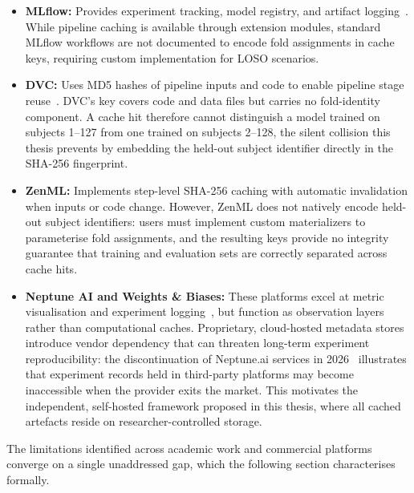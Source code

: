\begin{itemize}
\item \textbf{MLflow:} Provides experiment tracking, model registry, and
 artifact logging~\cite{zaharia2018mlflow}. While pipeline caching is
 available through extension modules, standard MLflow workflows are
 not documented to encode fold assignments in cache keys, requiring
 custom implementation for LOSO scenarios.

\item \textbf{DVC:} Uses MD5 hashes of pipeline inputs and code to enable
 pipeline stage reuse~\cite{dvc_pipelines}. DVC's key covers code and
 data files but carries no fold-identity component. A cache hit therefore
 cannot distinguish a model trained on subjects 1--127 from one trained on
 subjects 2--128, the silent collision this thesis prevents by embedding
 the held-out subject identifier directly in the SHA-256 fingerprint.

\item \textbf{ZenML:} Implements step-level SHA-256 caching with automatic
 invalidation when inputs or code change. However, ZenML does not natively
 encode held-out subject identifiers: users must implement custom
 materializers to parameterise fold assignments, and the resulting keys
 provide no integrity guarantee that training and evaluation sets are
 correctly separated across cache hits.

\item \textbf{Neptune AI and Weights \& Biases:} These platforms excel at
 metric visualisation and experiment logging~\cite{wandb2024docs}, but
 function as observation layers rather than computational caches.
 Proprietary, cloud-hosted metadata stores introduce vendor dependency
 that can threaten long-term experiment reproducibility: the
 discontinuation of Neptune.ai services in 2026~\cite{neptune2026shutdown}
 illustrates that experiment records held in third-party platforms may
 become inaccessible when the provider exits the market. This motivates
 the independent, self-hosted framework proposed in this thesis, where
 all cached artefacts reside on researcher-controlled storage.
\end{itemize}

The limitations identified across academic work and commercial platforms converge
on a single unaddressed gap, which the following section characterises formally.


